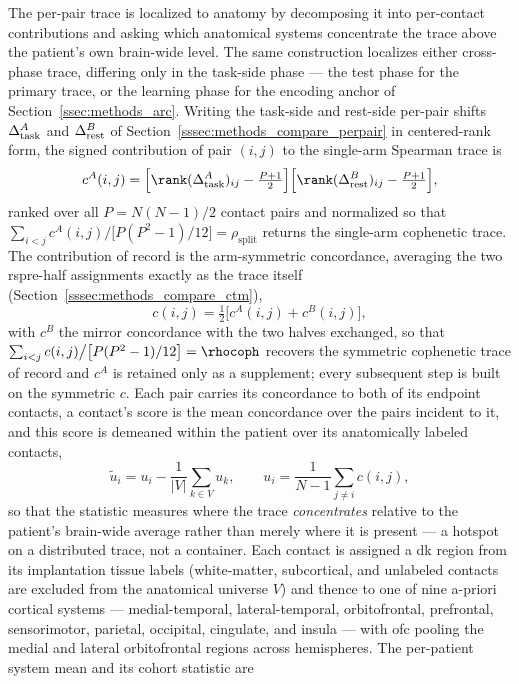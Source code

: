The per-pair trace is localized to anatomy by decomposing it into per-contact contributions and asking which anatomical systems concentrate the trace above the patient's own brain-wide level. The same construction localizes either cross-phase trace, differing only in the task-side phase --- the test phase for the primary trace, or the learning phase for the encoding anchor of Section~\ref{ssec:methods_arc}. Writing the task-side and rest-side per-pair shifts \(\Delta_{\rm task}^{A}\) and \(\Delta_{\rm rest}^{B}\) of Section~\ref{sssec:methods_compare_perpair} in centered-rank form, the signed contribution of pair \((i,j)\) to the single-arm Spearman trace is
\begin{equation}
    c^{A}(i,j) = \Big[\rank(\Delta_{\rm task}^{A})_{ij} - \tfrac{P+1}{2}\Big]\Big[\rank(\Delta_{\rm rest}^{B})_{ij} - \tfrac{P+1}{2}\Big],
    \label{eq:methods_anat_concordance}
\end{equation}
ranked over all \(P = N(N-1)/2\) contact pairs and normalized so that \(\sum_{i<j} c^{A}(i,j)\big/\big[P(P^{2}-1)/12\big] = \rho_{\mathrm{split}}\) returns the single-arm cophenetic trace. The contribution of record is the arm-symmetric concordance, averaging the two \acrshort{rspre}-half assignments exactly as the trace itself (Section~\ref{sssec:methods_compare_ctm}),
\begin{equation}
    c(i,j) = \tfrac{1}{2}\Big[c^{A}(i,j) + c^{B}(i,j)\Big],
    \label{eq:methods_anat_sym}
\end{equation}
with \(c^{B}\) the mirror concordance with the two halves exchanged, so that \(\sum_{i<j} c(i,j)\big/\big[P(P^{2}-1)/12\big] = \rhocoph\) recovers the symmetric cophenetic trace of record and \(c^{A}\) is retained only as a supplement; every subsequent step is built on the symmetric \(c\). Each pair carries its concordance to both of its endpoint contacts, a contact's score is the mean concordance over the pairs incident to it, and this score is demeaned within the patient over its anatomically labeled contacts,
\begin{equation}
    \tilde{u}_{i} = u_{i} - \frac{1}{|V|}\sum_{k \in V} u_{k}, \qquad u_{i} = \frac{1}{N-1}\sum_{j \neq i} c(i,j),
    \label{eq:methods_anat_node}
\end{equation}
so that the statistic measures where the trace \emph{concentrates} relative to the patient's brain-wide average rather than merely where it is present --- a hotspot on a distributed trace, not a container. Each contact is assigned a \gls{dk} region from its implantation tissue labels (white-matter, subcortical, and unlabeled contacts are excluded from the anatomical universe \(V\)) and thence to one of nine a-priori cortical systems --- medial-temporal, lateral-temporal, orbitofrontal, prefrontal, sensorimotor, parietal, occipital, cingulate, and insula --- with \gls{ofc} pooling the medial and lateral orbitofrontal regions across hemispheres. The per-patient system mean and its cohort statistic are
